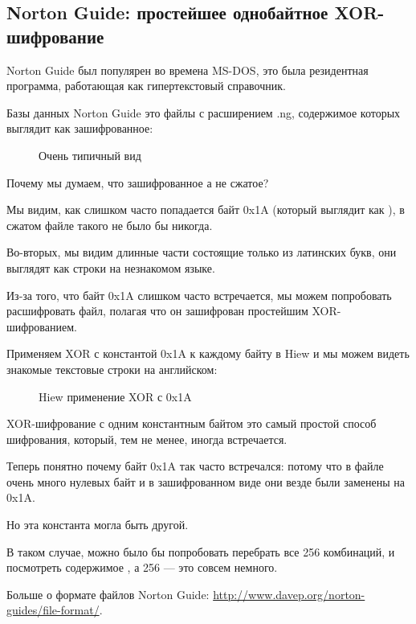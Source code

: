 \clearpage
\subsection{Norton Guide: простейшее однобайтное XOR-шифрование}
\label{norton_guide}

Norton Guide был популярен во времена MS-DOS, это была резидентная программа, работающая как
гипертекстовый справочник.

Базы данных Norton Guide это файлы с расширением .ng, содержимое которых выглядит как зашифрованное:

\begin{figure}[H]
\centering
{}
\caption{Очень типичный вид}
\end{figure}

Почему мы думаем, что зашифрованное а не сжатое? 

Мы видим, как слишком часто попадается байт 0x1A (который выглядит как \q{$\rightarrow$}), в сжатом файле такого не было бы никогда.

Во-вторых, мы видим длинные части состоящие только из латинских букв, они выглядят как строки
на незнакомом языке.

\clearpage

Из-за того, что байт 0x1A слишком часто встречается, мы можем попробовать расшифровать файл, полагая
что он зашифрован простейшим XOR-шифрованием.

Применяем XOR с константой 0x1A к каждому байту в Hiew и мы можем видеть знакомые текстовые строки на английском:

\begin{figure}[H]
\centering
{}
\caption{Hiew применение XOR с 0x1A}
\end{figure}

XOR-шифрование с одним константным байтом это самый простой способ шифрования, который, тем не менее, иногда
встречается.

Теперь понятно почему байт 0x1A так часто встречался: потому что в файле очень много нулевых байт 
и в зашифрованном виде они везде были заменены на 0x1A.

Но эта константа могла быть другой.

В таком случае, можно было бы попробовать перебрать все 256 комбинаций, и посмотреть содержимое , 
а 256 --- это совсем немного.

Больше о формате файлов Norton Guide: \url{http://www.davep.org/norton-guides/file-format/}.

